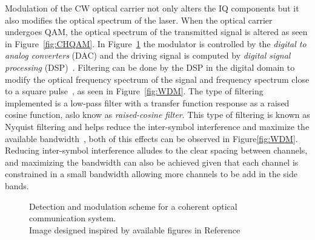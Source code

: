 Modulation of the CW optical carrier not only alters the IQ components but it also modifies the optical spectrum of the laser. When  the optical carrier undergoes QAM, the optical spectrum of the transmitted signal is altered as seen in Figure~\ref{fig:CHQAM}. In Figure~\ref{fig:DetMod} the modulator is controlled  by the \textit{digital to analog converters } (DAC) and the driving signal is computed by \textit{digital signal processing} (DSP)~\cite{kikuchi2015fundamentals}. Filtering can be done by the DSP in the digital domain to modify the optical frequency spectrum of the signal and frequency spectrum close to a square pulse~\cite{kikuchi2015fundamentals,FiberAgrawal}, as seen in Figure~\ref{fig:WDM}. The type of filtering implemented is a low-pass filter with a transfer function response as a raised cosine function, aslo know as \textit{raised-cosine filter}. This type of filtering is known as Nyquist filtering and helps reduce the inter-symbol interference and maximize the available bandwidth~\cite{zou2016spectrally}, both of this effects can be observed in  Figure\ref{fig:WDM}. Reducing inter-symbol interference alludes to the clear spacing between channels, and maximizing the bandwidth can also be achieved given that each channel is constrained in a small bandwidth allowing more channels to be add in the side bands.

\begin{figure}[h!]
 \centering
{}
  \qquad
  \caption{Detection and modulation scheme for a coherent optical communication system.\\ {\scriptsize Image designed inspired by available figures in Reference~\cite{ho2005generation,kikuchi2015fundamentals}} }
  \label{fig:DetMod}
\end{figure}


